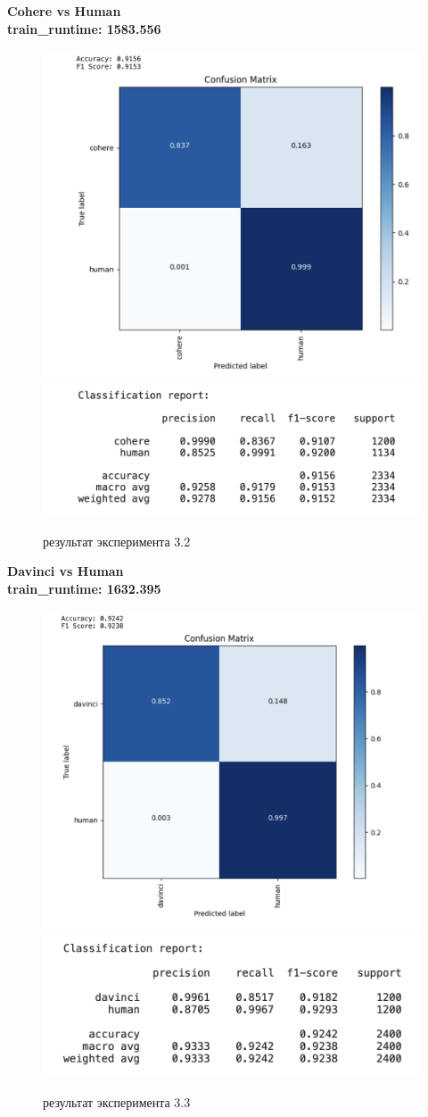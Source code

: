 \newpage
\textbf{Cohere vs Human}\\
\textbf{train\_runtime: 1583.556}
\begin{figure}[h]
    \centering
    \includegraphics[width=.75\textwidth]{images/cohere_human.png}
    \includegraphics[width=.65\textwidth]{images/exp3_cohere.png}
    \caption{результат эксперимента 3.2}
    \label{fig:4}
\end{figure}

\newpage
\textbf{Davinci vs Human}\\
\textbf{train\_runtime: 1632.395}
\begin{figure}[h]
    \centering
    \includegraphics[width=.75\textwidth]{images/davinci_human.png}
    \includegraphics[width=.65\textwidth]{images/exp3_davinci.png}
    \caption{результат эксперимента 3.3}
    \label{fig:5}
\end{figure}





